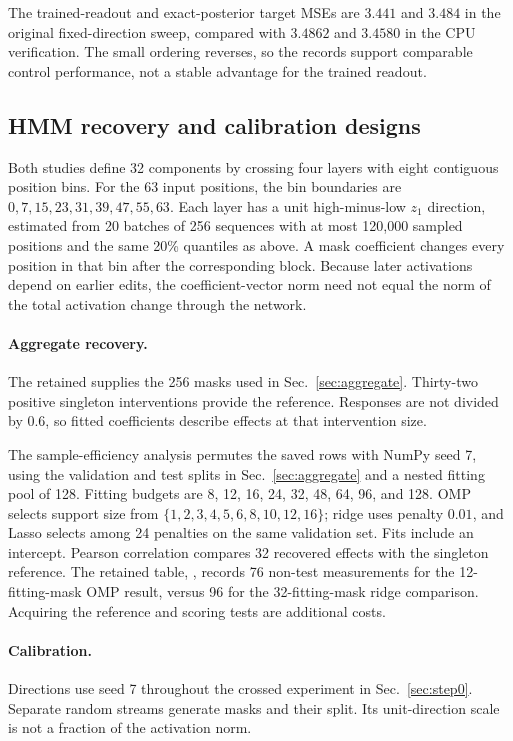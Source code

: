 The trained-readout and exact-posterior target MSEs are $3.441$ and $3.484$ in the original fixed-direction sweep, compared with $3.4862$ and $3.4580$ in the CPU verification. The small ordering reverses, so the records support comparable control performance, not a stable advantage for the trained readout.

\subsection{HMM recovery and calibration designs}\label{app:hmm-measurements}

Both studies define 32 components by crossing four layers with eight contiguous position bins. For the 63 input positions, the bin boundaries are $0,7,15,23,31,39,47,55,63$. Each layer has a unit high-minus-low $z_1$ direction, estimated from 20 batches of 256 sequences with at most 120,000 sampled positions and the same 20\% quantiles as above. A mask coefficient changes every position in that bin after the corresponding block. Because later activations depend on earlier edits, the coefficient-vector norm need not equal the norm of the total activation change through the network.

\paragraph{Aggregate recovery.}
The retained  supplies the 256 masks used in Sec.~\ref{sec:aggregate}. Thirty-two positive singleton interventions provide the reference. Responses are not divided by $0.6$, so fitted coefficients describe effects at that intervention size.

The sample-efficiency analysis permutes the saved rows with NumPy seed 7, using the validation and test splits in Sec.~\ref{sec:aggregate} and a nested fitting pool of 128. Fitting budgets are 8, 12, 16, 24, 32, 48, 64, 96, and 128. OMP selects support size from $\{1,2,3,4,5,6,8,10,12,16\}$; ridge uses penalty $0.01$, and Lasso selects among 24 penalties on the same validation set. Fits include an intercept. Pearson correlation compares 32 recovered effects with the singleton reference. The retained table, , records 76 non-test measurements for the 12-fitting-mask OMP result, versus 96 for the 32-fitting-mask ridge comparison. Acquiring the reference and scoring tests are additional costs.

\paragraph{Calibration.}
Directions use seed 7 throughout the crossed experiment in Sec.~\ref{sec:step0}. Separate random streams generate masks and their split. Its unit-direction scale is not a fraction of the activation norm.

